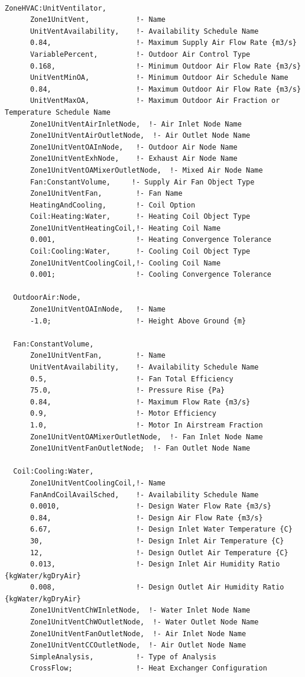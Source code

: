 \begin{lstlisting}

ZoneHVAC:UnitVentilator,
      Zone1UnitVent,           !- Name
      UnitVentAvailability,    !- Availability Schedule Name
      0.84,                    !- Maximum Supply Air Flow Rate {m3/s}
      VariablePercent,         !- Outdoor Air Control Type
      0.168,                   !- Minimum Outdoor Air Flow Rate {m3/s}
      UnitVentMinOA,           !- Minimum Outdoor Air Schedule Name
      0.84,                    !- Maximum Outdoor Air Flow Rate {m3/s}
      UnitVentMaxOA,           !- Maximum Outdoor Air Fraction or Temperature Schedule Name
      Zone1UnitVentAirInletNode,  !- Air Inlet Node Name
      Zone1UnitVentAirOutletNode,  !- Air Outlet Node Name
      Zone1UnitVentOAInNode,   !- Outdoor Air Node Name
      Zone1UnitVentExhNode,    !- Exhaust Air Node Name
      Zone1UnitVentOAMixerOutletNode,  !- Mixed Air Node Name
      Fan:ConstantVolume,     !- Supply Air Fan Object Type
      Zone1UnitVentFan,        !- Fan Name
      HeatingAndCooling,       !- Coil Option
      Coil:Heating:Water,      !- Heating Coil Object Type
      Zone1UnitVentHeatingCoil,!- Heating Coil Name
      0.001,                   !- Heating Convergence Tolerance
      Coil:Cooling:Water,      !- Cooling Coil Object Type
      Zone1UnitVentCoolingCoil,!- Cooling Coil Name
      0.001;                   !- Cooling Convergence Tolerance

  OutdoorAir:Node,
      Zone1UnitVentOAInNode,   !- Name
      -1.0;                    !- Height Above Ground {m}

  Fan:ConstantVolume,
      Zone1UnitVentFan,        !- Name
      UnitVentAvailability,    !- Availability Schedule Name
      0.5,                     !- Fan Total Efficiency
      75.0,                    !- Pressure Rise {Pa}
      0.84,                    !- Maximum Flow Rate {m3/s}
      0.9,                     !- Motor Efficiency
      1.0,                     !- Motor In Airstream Fraction
      Zone1UnitVentOAMixerOutletNode,  !- Fan Inlet Node Name
      Zone1UnitVentFanOutletNode;  !- Fan Outlet Node Name

  Coil:Cooling:Water,
      Zone1UnitVentCoolingCoil,!- Name
      FanAndCoilAvailSched,    !- Availability Schedule Name
      0.0010,                  !- Design Water Flow Rate {m3/s}
      0.84,                    !- Design Air Flow Rate {m3/s}
      6.67,                    !- Design Inlet Water Temperature {C}
      30,                      !- Design Inlet Air Temperature {C}
      12,                      !- Design Outlet Air Temperature {C}
      0.013,                   !- Design Inlet Air Humidity Ratio {kgWater/kgDryAir}
      0.008,                   !- Design Outlet Air Humidity Ratio {kgWater/kgDryAir}
      Zone1UnitVentChWInletNode,  !- Water Inlet Node Name
      Zone1UnitVentChWOutletNode,  !- Water Outlet Node Name
      Zone1UnitVentFanOutletNode,  !- Air Inlet Node Name
      Zone1UnitVentCCOutletNode,  !- Air Outlet Node Name
      SimpleAnalysis,          !- Type of Analysis
      CrossFlow;               !- Heat Exchanger Configuration


\end{lstlisting}
